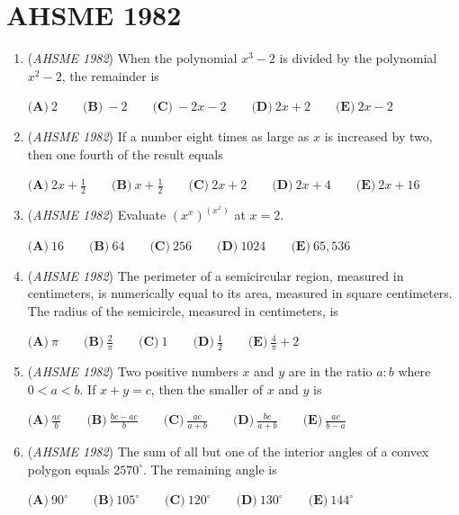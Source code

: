 \section{AHSME 1982}
        \begin{enumerate}
        	\item (\textit{AHSME 1982}) When the polynomial $x^3-2$ is divided by the polynomial $x^2-2$, the remainder is 


 $\textbf{(A)} \ 2 \qquad  \textbf{(B)} \ -2 \qquad  \textbf{(C)} \ -2x-2 \qquad  \textbf{(D)} \ 2x+2 \qquad  \textbf{(E)} \ 2x-2$


	\item (\textit{AHSME 1982}) If a number eight times as large as $x$ is increased by two, then one fourth of the result equals 


 $\textbf{(A)} \ 2x + \frac{1}{2} \qquad  \textbf{(B)} \ x + \frac{1}{2} \qquad  \textbf{(C)} \ 2x+2 \qquad  \textbf{(D)}\ 2x+4 \qquad \textbf{(E)}\ 2x+16$


	\item (\textit{AHSME 1982}) Evaluate $(x^x)^{(x^x)}$ at $x = 2$. 


 $\textbf{(A)} \ 16 \qquad  \textbf{(B)} \ 64 \qquad  \textbf{(C)} \ 256 \qquad  \textbf{(D)} \ 1024 \qquad  \textbf{(E)} \ 65,536$


	\item (\textit{AHSME 1982}) The perimeter of a semicircular region, measured in centimeters, is numerically equal to its area, 
measured in square centimeters. The radius of the semicircle, measured in centimeters, is 


 $\textbf{(A)} \ \pi \qquad  \textbf{(B)} \ \frac{2}{\pi} \qquad  \textbf{(C)} \ 1 \qquad  \textbf{(D)} \ \frac{1}{2}\qquad \textbf{(E)} \ \frac{4}{\pi}+2$


	\item (\textit{AHSME 1982}) Two positive numbers $x$ and $y$ are in the ratio $a: b$ where $0 < a < b$. If $x+y = c$, then the smaller of $x$ and $y$ is 


 $\textbf{(A)} \ \frac{ac}{b} \qquad  \textbf{(B)} \ \frac{bc-ac}{b} \qquad  \textbf{(C)} \ \frac{ac}{a+b} \qquad  \textbf{(D)}\ \frac{bc}{a+b}\qquad \textbf{(E)}\ \frac{ac}{b-a}$


	\item (\textit{AHSME 1982}) The sum of all but one of the interior angles of a convex polygon equals $2570^\circ$. The remaining angle is 


 $\textbf{(A)} \ 90^\circ \qquad  \textbf{(B)} \ 105^\circ \qquad  \textbf{(C)} \ 120^\circ \qquad  \textbf{(D)}\ 130^\circ\qquad \textbf{(E)}\ 144^\circ$



\end{enumerate}
